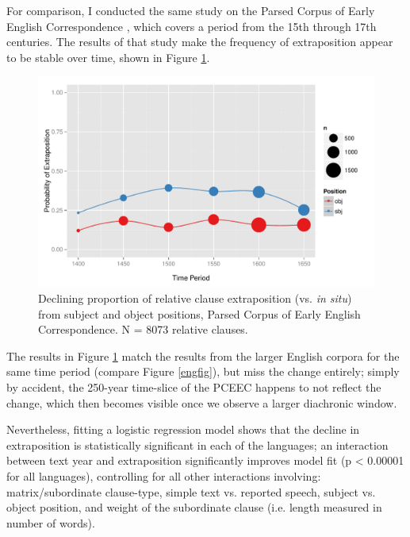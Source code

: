 For comparison, I conducted the same study on the Parsed Corpus of Early English Correspondence \citep[PCEEC][]{pceec}, which covers a period from the 15th through 17th centuries. The results of that study make the frequency of extraposition appear to be stable over time, shown in Figure \ref{pceecfig}.

\begin{figure}
  \includegraphics[width=1.1\textwidth]{stableVarTalks/exSbjObjYearBinned50.pdf}
\caption{Declining proportion of relative clause extraposition (vs. \textsl{in situ}) from subject and object positions, Parsed Corpus of Early English Correspondence. N = 8073 relative clauses. }
\label{pceecfig}       
\end{figure}

\noindent The results in Figure \ref{pceecfig} match the results from the larger English corpora for the same time period (compare Figure \ref{engfig}), but miss the change entirely; simply by accident, the 250-year time-slice of the PCEEC happens to not reflect the change, which then becomes visible once we observe a larger diachronic window.

Nevertheless, fitting a logistic regression model shows that the decline in extraposition is statistically significant in each of the languages; an interaction between text year and extraposition significantly improves model fit (p < 0.00001 for all languages), controlling for all other interactions involving: matrix/subordinate clause-type, simple text vs. reported speech, subject vs. object position, and weight of the subordinate clause (i.e. length measured in number of words).

